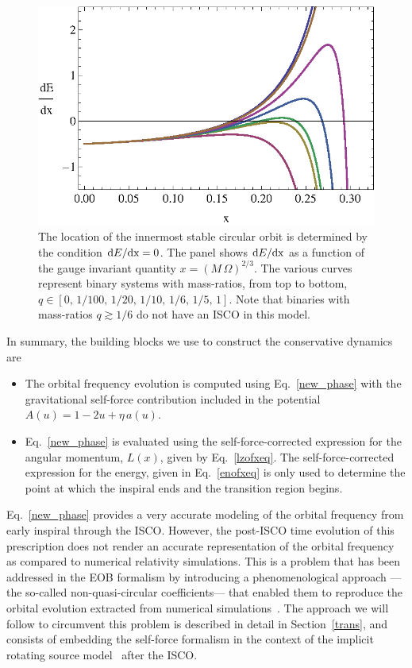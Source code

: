  
\begin{figure}[ht]
\centerline{
\includegraphics[height=0.33\textwidth,  clip]{figures/imrimri/dedx_for_isco.eps}
}
\caption{The location of the innermost stable circular orbit is determined by the condition \({\rm{d}}E/\rm{d}x = 0\). The panel shows \({\rm{d}}E/\rm{d}x\) as a function of the gauge invariant quantity \(x=\left(M\,\Omega\right)^{2/3}\). The various curves represent binary systems with mass-ratios, from top to bottom, \(q \in [0,\, 1/100, \,1/20, \,1/10, \,1/6, \,1/5, \,1 ]\). Note that binaries with mass-ratios \(q\gtrsim 1/6\) do not have an ISCO in this model. }
\label{dedx}
\end{figure}

In summary, the building blocks we use to construct the conservative dynamics are

\begin{itemize}
\item The orbital frequency evolution is computed using Eq.~\eqref{new_phase} with the gravitational self-force contribution included in the potential \(A(u)= 1-2u + \eta\, a(u)\).
\item Eq.~\eqref{new_phase} is evaluated using the self-force-corrected expression for the angular momentum, \(L(x)\), given by Eq.~\eqref{lzofxeq}. The self-force-corrected expression for the energy, given in Eq.~\eqref{enofxeq} is only used to determine the point at which the inspiral ends and the transition region begins.
\end{itemize}

Eq.~\eqref{new_phase} provides a very accurate modeling of the orbital frequency from early inspiral through the ISCO. However, the post-ISCO time evolution of this prescription does not render an accurate representation of the orbital frequency as compared to numerical relativity simulations. This is a problem that has been addressed in the EOB formalism by introducing a phenomenological approach ---the so-called non-quasi-circular coefficients--- that enabled them to reproduce the orbital evolution extracted from numerical simulations~\cite{BuonannoEOBv2Main}. The approach we will follow to circumvent this problem is described in detail in Section~\ref{trans}, and consists of embedding the self-force formalism in the context of the implicit rotating source model~\cite{Baker:2008} after the ISCO.

